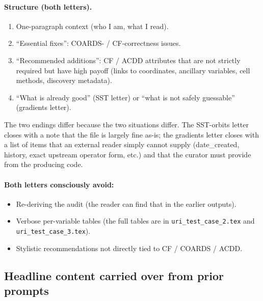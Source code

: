 \documentclass[11pt]{article}
\begin{document}
\paragraph{Structure (both letters).}
\begin{enumerate}
  \item One-paragraph context (who I am, what I read).
  \item ``Essential fixes'': COARDS- / CF-correctness issues.
  \item ``Recommended additions'': CF / ACDD attributes that are
    not strictly required but have high payoff (links to
    coordinates, ancillary variables, cell methods, discovery
    metadata).
  \item ``What is already good'' (SST letter) or ``what is not
    safely guessable'' (gradients letter).
\end{enumerate}
The two endings differ because the two situations differ. The
SST-orbits letter closes with a note that the file is largely fine
as-is; the gradients letter closes with a list of items that an
external reader simply cannot supply (date\_created, history,
exact upstream operator form, etc.) and that the curator must
provide from the producing code.

\paragraph{Both letters consciously avoid:}
\begin{itemize}
  \item Re-deriving the audit (the reader can find that in the
    earlier outputs).
  \item Verbose per-variable tables (the full tables are in
    \texttt{uri\_test\_case\_2.tex} and
    \texttt{uri\_test\_case\_3.tex}).
  \item Stylistic recommendations not directly tied to CF / COARDS /
    ACDD.
\end{itemize}

\subsection{Headline content carried over from prior prompts}
\end{document}
